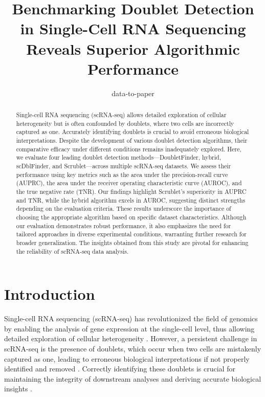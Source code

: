 \documentclass[11pt]{article}
\title{Benchmarking Doublet Detection in Single-Cell RNA Sequencing Reveals Superior Algorithmic Performance}
\author{data-to-paper}
\begin{document}
\maketitle
\begin{abstract}
Single-cell RNA sequencing (scRNA-seq) allows detailed exploration of cellular heterogeneity but is often confounded by doublets, where two cells are incorrectly captured as one. Accurately identifying doublets is crucial to avoid erroneous biological interpretations. Despite the development of various doublet detection algorithms, their comparative efficacy under different conditions remains inadequately explored. Here, we evaluate four leading doublet detection methods—DoubletFinder, hybrid, scDblFinder, and Scrublet—across multiple scRNA-seq datasets. We assess their performance using key metrics such as the area under the precision-recall curve (AUPRC), the area under the receiver operating characteristic curve (AUROC), and the true negative rate (TNR). Our findings highlight Scrublet's superiority in AUPRC and TNR, while the hybrid algorithm excels in AUROC, suggesting distinct strengths depending on the evaluation criteria. These results underscore the importance of choosing the appropriate algorithm based on specific dataset characteristics. Although our evaluation demonstrates robust performance, it also emphasizes the need for tailored approaches in diverse experimental conditions, warranting further research for broader generalization. The insights obtained from this study are pivotal for enhancing the reliability of scRNA-seq data analysis.
\end{abstract}
\section*{Introduction}

Single-cell RNA sequencing (scRNA-seq) has revolutionized the field of genomics by enabling the analysis of gene expression at the single-cell level, thus allowing detailed exploration of cellular heterogeneity \cite{Xi2020BenchmarkingCD}. However, a persistent challenge in scRNA-seq is the presence of doublets, which occur when two cells are mistakenly captured as one, leading to erroneous biological interpretations if not properly identified and removed \cite{Bais2019scdsCA}. Correctly identifying these doublets is crucial for maintaining the integrity of downstream analyses and deriving accurate biological insights \cite{Choudhary2021ComparisonAE,DePasquale2019DoubletDeconDD}. 
\end{document}

